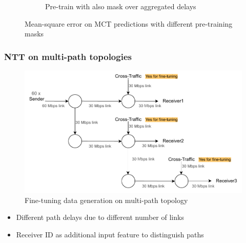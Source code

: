 \documentclass{beamer}
\begin{document}
\begin{frame}
\begin{figure}[h]
\begin{subfigure}[h]{0.5\textwidth}
        \caption{Pre-train with also mask over aggregated delays}
    \end{subfigure}
    \caption{Mean-square error on MCT predictions with different pre-training masks}
    \label{fig:mct_mask}
\end{figure}
\end{frame}

\begin{frame}
\frametitle{NTT on multi-path topologies}


\begin{figure}[h]
  \begin{center}
    \includegraphics[scale=0.55]{figures/complex_topo.pdf}
    \caption{Fine-tuning data generation on multi-path topology}
    \label{fig:topo_ft_big}
  \end{center}
\end{figure}

\pause 

\begin{itemize}
    \item<1-> Different path delays due to different number of links 
    \item<1-> Receiver ID as additional input feature to distinguish paths
\end{itemize}

\end{frame}
\end{document}
